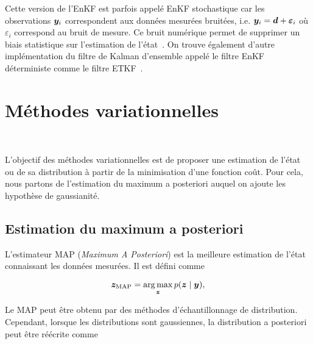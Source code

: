 Cette version de l'EnKF est parfois appelé EnKF stochastique car les observations $\bm{y}_i$ correspondent aux données mesurées bruitées, i.e. $\bm{y}_i = \bm{d} + \bm \varepsilon_i$ où $\varepsilon_i$ correspond au bruit de mesure. Ce bruit numérique permet de supprimer un biais statistique sur l'estimation de l'état~\cite{van_leeuwen_consistent_2020}. On trouve également d'autre implémentation du filtre de Kalman d'ensemble appelé le filtre EnKF déterministe comme le filtre ETKF~\cite{bishop_adaptive_2001}.

\section{Méthodes variationnelles}~\label{sec:variation}

L'objectif des méthodes variationnelles est de proposer une estimation de l'état ou de sa distribution à partir de la minimisation d'une fonction coût. Pour cela, nous partons de l'estimation du maximum a posteriori auquel on ajoute les hypothèse de gaussianité.

\subsection{Estimation du maximum a posteriori}

L'estimateur MAP (\textit{Maximum A Posteriori}) est la meilleure estimation de l'état connaissant les données mesurées. Il est défini comme

\begin{equation*}
    \bm z_{\text{MAP}} = \operatorname*{arg\,max}_{\bm z} p(\bm z \mid \bm y),
\end{equation*}

Le MAP peut être obtenu par des méthodes d'échantillonnage de distribution. Cependant, lorsque les distributions sont gaussiennes, la distribution a posteriori peut être réécrite comme



